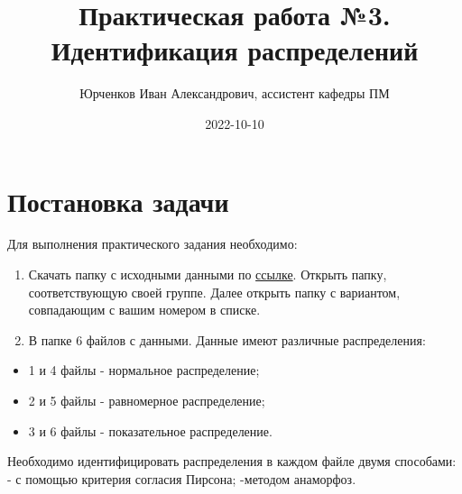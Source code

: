 \documentclass[
  14,
]{article}
\title{Практическая работа №3. Идентификация распределений}
\author{Юрченков Иван Александрович, ассистент кафедры ПМ}
\date{2022-10-10}
\providecommand{\tightlist}{%
  \setlength{\itemsep}{0pt}\setlength{\parskip}{0pt}}
\begin{document}
\maketitle

\hypertarget{ux43fux43eux441ux442ux430ux43dux43eux432ux43aux430-ux437ux430ux434ux430ux447ux438}{%
\section{\texorpdfstring{\textbf{Постановка
задачи}}{Постановка задачи}}\label{ux43fux43eux441ux442ux430ux43dux43eux432ux43aux430-ux437ux430ux434ux430ux447ux438}}

Для выполнения практического задания необходимо:

\begin{enumerate}
\def\labelenumi{\arabic{enumi}.}
\item
  Скачать папку с исходными данными по
  \href{https://disk.yandex.ru/d/PwFd-L8zn7x8eQ}{ссылке}. Открыть папку,
  соответствующую своей группе. Далее открыть папку с вариантом,
  совпадающим с вашим номером в списке.
\item
  В папке 6 файлов с данными. Данные имеют различные распределения:
\end{enumerate}

\begin{itemize}
\tightlist
\item
  1 и 4 файлы - нормальное распределение;
\item
  2 и 5 файлы - равномерное распределение;
\item
  3 и 6 файлы - показательное распределение.
\end{itemize}

Необходимо идентифицировать распределения в каждом файле двумя
способами: - с помощью критерия согласия Пирсона; -методом анаморфоз.
\end{document}
